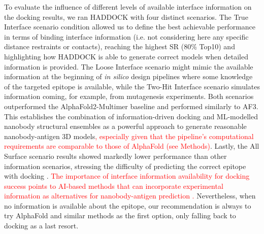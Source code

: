 \documentclass[12pt]{article}
\begin{document}
To evaluate the influence of different levels of available interface information on the docking results, we ran HADDOCK with four distinct scenarios. The True Interface scenario condition allowed us to define the best achievable performance in terms of binding interface information (i.e. not considering here any specific distance restraints or contacts), reaching the highest SR (80\% Top10) and highlighting how HADDOCK is able to generate correct models when detailed information is provided. The Loose Interface scenario might mimic the available information at the beginning of \textit{in silico} design pipelines where some knowledge of the targeted epitope is available, while the Two-Hit Interface scenario simulates information coming, for example, from mutagenesis experiments. Both scenarios outperformed the AlphaFold2-Multimer baseline and performed similarly to AF3. This establishes the combination of information-driven docking and ML-modelled nanobody structural ensembles as a powerful approach to generate reasonable nanobody-antigen 3D models\textcolor{Red}{, especially given that the pipeline's computational requirements are comparable to those of AlphaFold (see Methods)}. Lastly, the All Surface scenario results showed markedly lower performance than other information scenarios, stressing the difficulty of predicting the correct epitope with docking \cite{desta2023cluspro}. \textcolor{Red}{The importance of interface information availability for docking success points to AI-based methods that can incorporate experimental information as alternatives for nanobody-antigen prediction \cite{Stahl2023alphalink, Feng2024colabdock, Xie2025grasp}.} Nevertheless, when no information is available about the epitope, our recommendation is always to try AlphaFold and similar methods as the first option, only falling back to docking as a last resort.
\end{document}
